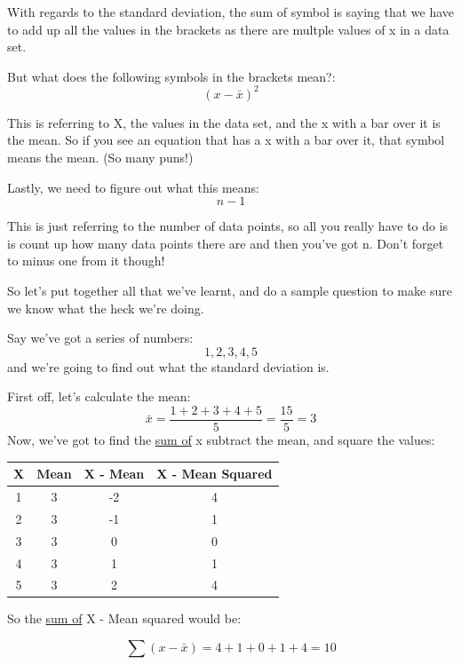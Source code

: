 \documentclass[11pt]{article}
\begin{document}
With regards to the standard deviation, the sum of symbol is saying that we have to add up all the values in the brackets as there are multple values of x in a data set.

But what does the following symbols in the brackets mean?:
\begin{displaymath}
(x - \bar{x})^{2}
\end{displaymath}

This is referring to X, the values in the data set, and the x with a bar over it is the mean. So if you see an equation that has a x with a bar over it, that symbol means the mean. (So many puns!)

Lastly, we need to figure out what this means:
\begin{displaymath}
n-1 
\end{displaymath}

This is just referring to the number of data points, so all you really have to do is is count up how many data points there are and then you've got n. Don't forget to minus one from it though!

So let's put together all that we've learnt, and do a sample question to make sure we know what the heck we're doing.

Say we've got a series of numbers:
\begin{displaymath}
1, 2, 3, 4, 5 
\end{displaymath}
and we're going to find out what the standard deviation is.

First off, let's calculate the mean:
\begin{displaymath}
\bar{x}= \frac{1 + 2 + 3 + 4 + 5}{5} = \frac{15}{5} = 3
\end{displaymath}
Now, we've got to find the \underline{sum of} x subtract the mean, and square the values:

\begin{tabular}{|c|c|c|c|}
\hline
	X & Mean & X - Mean & X - Mean Squared\\
\hline
	1 & 3 & -2 & 4\\
\hline
	2 & 3 & -1 & 1\\
\hline
	3 & 3 & 0 & 0\\
\hline
	4 & 3 & 1 & 1\\
\hline
	5 & 3 & 2 & 4\\
\hline
\end{tabular}

So the \underline{sum of} X - Mean squared would be:

\begin{displaymath}
\sum (x- \bar{x})= {4 + 1 + 0 + 1 + 4} = 10
\end{displaymath}
\end{document}
